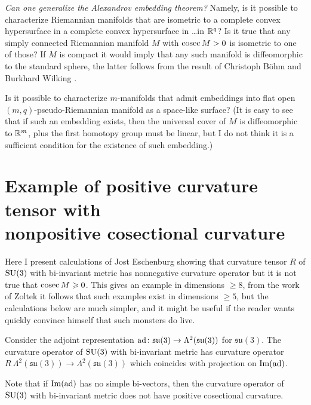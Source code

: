\documentclass{article}
\begin{document}
\medskip

\textit{Can one generalize the Alexandrov embedding theorem?}
Namely, is it possible to characterize Riemannian manifolds that are isometric to a complete convex hypersurface in a complete convex hypersurface in \dots in $\mathbb{R}^q$? 
Is it true that any simply
connected Riemannian manifold $M$ with $\mathop{\rm cosec}\nolimits M>0$ is isometric to one of
those? 
If $M$ is compact it would imply that any such manifold is diffeomorphic to the standard sphere,
the latter follows from the result of Christoph Böhm and Burkhard Wilking \cite{BW}.

\medskip

Is it possible to characterize $m$-manifolds that admit embeddings into flat open $(m,q)$-pseudo-Riemannian manifold as a space-like surface?
(It is easy to see that if such an embedding exists, then 
the universal cover of $M$ is diffeomorphic to $\mathbb{R}^m$, plus the first homotopy group must be linear, but I do not think it is a sufficient condition for the existence of such embedding.)

\appendix

\section[Example of positive curvature tensor with nonpositive cosectional curvature]{Example of positive curvature tensor with\\ nonpositive cosectional curvature}

Here I present calculations of Jost Eschenburg showing that
curvature tensor $R$ of $\text{\rm SU}(3)$ with bi-invariant metric has
nonnegative curvature operator but it is not true that $\mathop{\rm cosec}\nolimits M\geqslant 0$.
This gives an example in dimensions $\ge 8$, from the work of
Zoltek \cite{Zol} it follows that such examples exist in dimensions $\ge 5$, but the calculations below are much simpler, and it might be useful if the reader wants quickly convince himself that such monsters do live.

\medskip

Consider the adjoint representation
$\mathrm{ad}\colon\mathfrak{su}(3)\to \Lambda^2(\mathfrak{su}(3))$ for $\mathfrak{su}(3)$.
The curvature operator of $\text{\rm SU}(3)$
with bi-invariant metric has curvature operator
$R\:\Lambda^2(\mathfrak{su}(3))\to \Lambda^2(\mathfrak{su}(3))$ which coincides with
projection on $\mathrm{Im}(\mathrm{ad})$.

Note that if $\mathrm{Im}(\mathrm{ad})$ has no simple bi-vectors,
then the curvature operator of $\text{\rm SU}(3)$ with bi-invariant metric
does not have positive cosectional curvature.
\end{document}

